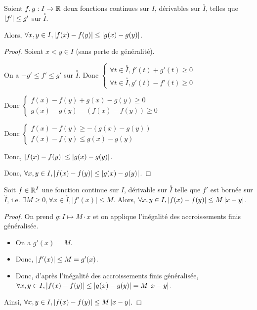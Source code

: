 \documentclass[12pt, a4paper]{report}
\begin{document}
\begin{theorem}
  Soient $f,g : I \to \mathbb{R}$ deux fonctions continues sur $I$, dérivables sur $\overset{\circ}{I}$, telles que $\left|f'\right| \le g'$ sur $\overset{\circ}{I}$.

  Alors, $\forall x,y \in I, \left|f(x)-f(y)\right| \leq \left|g(x)-g(y)\right|$.
\end{theorem}

\begin{proof}
  Soient $x<y \in I$ (sans perte de généralité).

  On a $-g'\le f' \le g'$ sur $\overset{\circ}{I}$.
  Donc $\begin{cases}
\forall t \in \overset{\circ}{I}, f'(t) + g'(t) \ge 0 \\ \forall t \in \overset{\circ}{I}, g'(t) - f'(t) \ge 0
\end{cases}$

  Donc $\begin{cases}
    f(x) - f(y) + g(x) - g(y) \ge 0 \\ g(x) - g(y) - (f(x) - f(y)) \ge 0
  \end{cases}$

  Donc $\begin{cases}
    f(x) - f(y) \ge -(g(x) - g(y)) \\ f(x) - f(y) \le g(x) - g(y)
  \end{cases}$

  Donc, $\left|f(x) - f(y)\right| \leq \left|g(x) - g(y)\right|$.

  Donc, $\forall x,y \in I, \left|f(x)-f(y)\right| \leq \left|g(x)-g(y)\right|$.
\end{proof}

\begin{consequence}
  Soit $f \in \mathbb{R}^I$ une fonction continue sur $I$, dérivable sur $\overset{\circ}{I}$ telle que $f'$ est bornée sur $\overset{\circ}{I}$, i.e. $\exists M\geq 0, \forall x\in \overset{\circ}{I}, |f'(x)| \leq M$. Alors, $\forall x,y \in I, \left|f(x)-f(y)\right| \leq M \left|x-y\right|$.
\end{consequence}

\begin{proof}
  On prend $g: I \mapsto M\cdot x$ et on applique l'inégalité des accroissements finis généralisée.

  \begin{itemize}
    \item On a $g'(x) = M$.
    \item Donc, $\left|f'(x)\right| \leq M = g'(x)$.
    \item Donc, d'après l'inégalité des accroissements finis généralisée, $\forall x,y \in I, \left|f(x)-f(y)\right| \leq \left|g(x)-g(y)\right| = M\left|x-y\right|$.
  \end{itemize}

  Ainsi, $\forall x,y \in I, \left|f(x)-f(y)\right| \leq M \left|x-y\right|$.
\end{proof}
\end{document}
